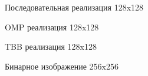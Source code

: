 \documentclass{report}
\begin{document}
\begin{figure}[H]
\caption{Последовательная реализация 128x128}
\end{figure}

\begin{figure}[H]
\caption{OMP реализация 128x128}
\end{figure}

\begin{figure}[H]
\caption{TBB реализация 128x128}
\end{figure}

\begin{figure}[H]
\caption{Бинарное изображение 256x256}
\end{figure}
\end{document}
